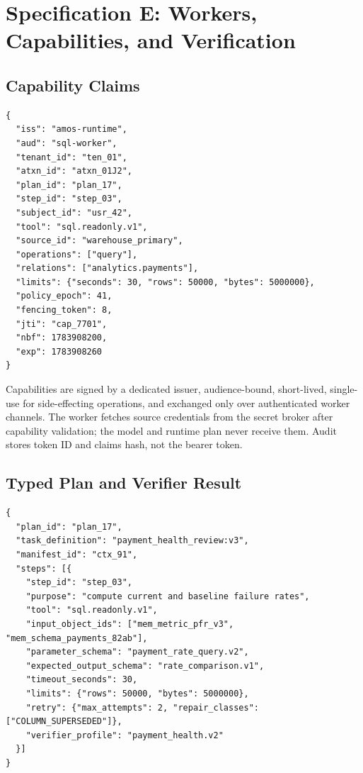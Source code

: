 \documentclass[10pt]{article}
\begin{document}
\section{Specification E: Workers, Capabilities, and Verification}

\subsection{Capability Claims}

\begin{lstlisting}[style=contract]
{
  "iss": "amos-runtime",
  "aud": "sql-worker",
  "tenant_id": "ten_01",
  "atxn_id": "atxn_01J2",
  "plan_id": "plan_17",
  "step_id": "step_03",
  "subject_id": "usr_42",
  "tool": "sql.readonly.v1",
  "source_id": "warehouse_primary",
  "operations": ["query"],
  "relations": ["analytics.payments"],
  "limits": {"seconds": 30, "rows": 50000, "bytes": 5000000},
  "policy_epoch": 41,
  "fencing_token": 8,
  "jti": "cap_7701",
  "nbf": 1783908200,
  "exp": 1783908260
}
\end{lstlisting}

Capabilities are signed by a dedicated issuer, audience-bound, short-lived, single-use for side-effecting operations, and exchanged only over authenticated worker channels. The worker fetches source credentials from the secret broker after capability validation; the model and runtime plan never receive them. Audit stores token ID and claims hash, not the bearer token.

\Needspace{0.55\textheight}
\subsection{Typed Plan and Verifier Result}

\begin{lstlisting}[style=contract]
{
  "plan_id": "plan_17",
  "task_definition": "payment_health_review:v3",
  "manifest_id": "ctx_91",
  "steps": [{
    "step_id": "step_03",
    "purpose": "compute current and baseline failure rates",
    "tool": "sql.readonly.v1",
    "input_object_ids": ["mem_metric_pfr_v3", "mem_schema_payments_82ab"],
    "parameter_schema": "payment_rate_query.v2",
    "expected_output_schema": "rate_comparison.v1",
    "timeout_seconds": 30,
    "limits": {"rows": 50000, "bytes": 5000000},
    "retry": {"max_attempts": 2, "repair_classes": ["COLUMN_SUPERSEDED"]},
    "verifier_profile": "payment_health.v2"
  }]
}
\end{lstlisting}
\end{document}
